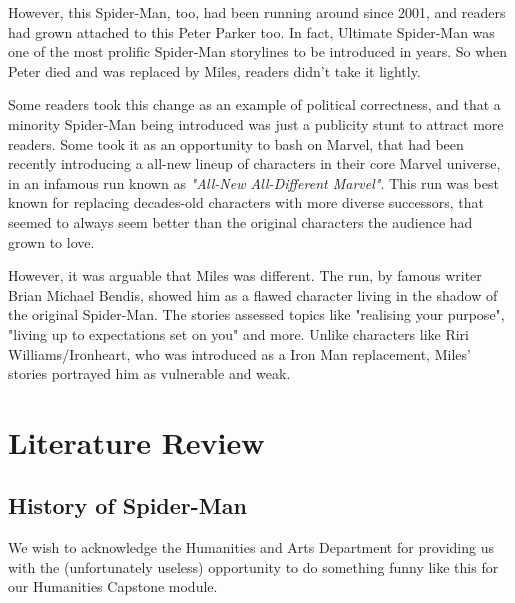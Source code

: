 \documentclass[%
 reprint,
 amsmath,amssymb,
 aps,
]{revtex4-2}
\begin{document}
However, this Spider-Man, too, had been running around since 2001, and readers had grown attached to this Peter Parker too. In fact, Ultimate Spider-Man was one of the most prolific Spider-Man storylines to be introduced in years. So when Peter died and was replaced by Miles, readers didn't take it lightly.

Some readers took this change as an example of political correctness, and that a minority Spider-Man being introduced was just a publicity stunt to attract more readers. Some took it as an opportunity to bash on Marvel, that had been recently introducing a all-new lineup of characters in their core Marvel universe, in an infamous run known as \emph{"All-New All-Different Marvel"}. This run was best known for replacing decades-old characters with more diverse successors, that seemed to always seem better than the original characters the audience had grown to love.

However, it was arguable that Miles was different. The run, by famous writer Brian Michael Bendis, showed him as a flawed character living in the shadow of the original Spider-Man. The stories assessed topics like "realising your purpose", "living up to expectations set on you" and more. Unlike characters like Riri Williams/Ironheart, who was introduced as a Iron Man replacement, Miles' stories portrayed him as vulnerable and weak.

\section{\label{sec:literature-review}Literature Review}

\subsection{\label{subsec:history}History of Spider-Man}

\begin{acknowledgments}
We wish to acknowledge the Humanities and Arts Department for providing us with the (unfortunately useless) opportunity to do something funny like this for our Humanities Capstone module.
\end{acknowledgments}


\nocite{*}

\end{document}

